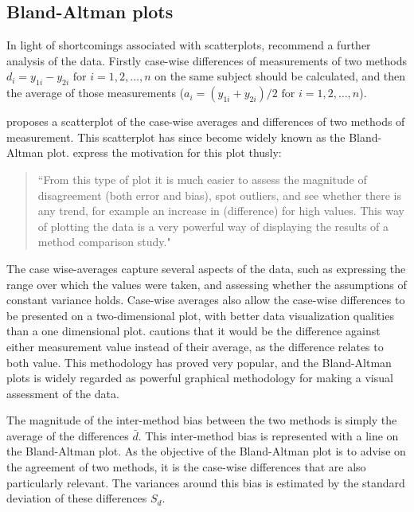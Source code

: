 \documentclass[Main.tex]{subfiles}
\begin{document}
\subsection{Bland-Altman plots}


In light of shortcomings associated with scatterplots,
\citet*{BA83} recommend a further analysis of the data. Firstly
case-wise differences of measurements of two methods $d_{i} =
y_{1i}-y_{2i} \mbox{ for }i=1,2,\dots,n$ on the same subject
should be calculated, and then the average of those measurements
($a_{i} = (y_{1i} + y_{2i})/2 \mbox{ for }i=1,2,\dots, n$).

\citet{BA83} proposes a scatterplot of the case-wise averages and differences of two methods of measurement. This scatterplot has since become widely known as the Bland-Altman plot. \citet*{BA83} express the
motivation for this plot thusly:
\begin{quote}
	``From this type of plot it is much easier to assess the magnitude
	of disagreement (both error and bias), spot outliers, and see
	whether there is any trend, for example an increase in (difference) for high values. This way of plotting the data is a very powerful way of displaying the results of a method comparison study."
\end{quote}






The case wise-averages capture several aspects of the data, such as expressing the range over which the values were taken, and assessing whether the assumptions of constant variance holds.
Case-wise averages also allow the case-wise differences to be presented on a two-dimensional plot, with better data visualization qualities than a one dimensional plot. \citet{BA86}
cautions that it would be the difference against either measurement value instead of their average, as the difference relates to both value. This methodology has proved very popular, and the Bland-Altman plots is widely regarded as powerful graphical methodology for making a visual assessment of the data.

The magnitude of the inter-method bias between the two methods is simply the average of the differences $\bar{d}$. This inter-method bias is represented with a line on the Bland-Altman plot. As the objective of the Bland-Altman plot is to advise on the agreement of two methods, it is the case-wise differences that are also particularly relevant. The variances around this bias is estimated by the standard deviation of these differences $S_{d}$.
\end{document}
